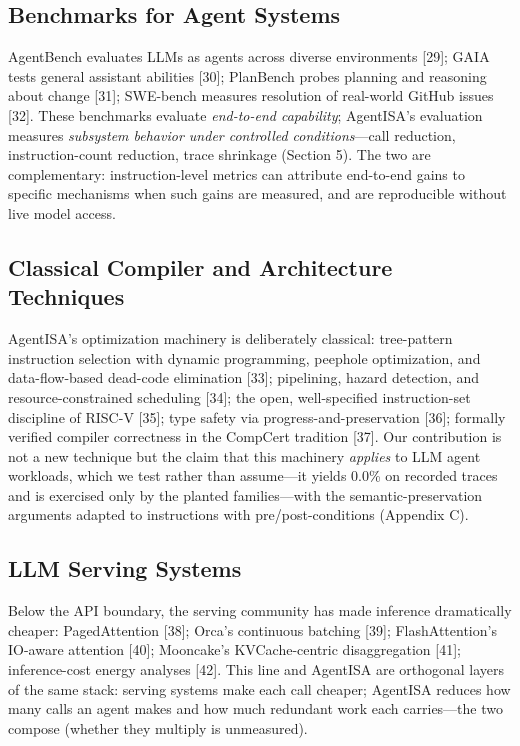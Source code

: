\documentclass[
  sigconf,
  anonymous]{acmart}
\begin{document}
\subsection{Benchmarks for Agent
Systems}\label{benchmarks-for-agent-systems}

AgentBench evaluates LLMs as agents across diverse environments
{[}29{]}; GAIA tests general assistant abilities {[}30{]}; PlanBench
probes planning and reasoning about change {[}31{]}; SWE-bench measures
resolution of real-world GitHub issues {[}32{]}. These benchmarks
evaluate \emph{end-to-end capability}; AgentISA's evaluation measures
\emph{subsystem behavior under controlled conditions}---call reduction,
instruction-count reduction, trace shrinkage (Section 5). The two are
complementary: instruction-level metrics can attribute end-to-end gains
to specific mechanisms when such gains are measured, and are
reproducible without live model access.

\subsection{Classical Compiler and Architecture
Techniques}\label{classical-compiler-and-architecture-techniques}

AgentISA's optimization machinery is deliberately classical:
tree-pattern instruction selection with dynamic programming, peephole
optimization, and data-flow-based dead-code elimination {[}33{]};
pipelining, hazard detection, and resource-constrained scheduling
{[}34{]}; the open, well-specified instruction-set discipline of RISC-V
{[}35{]}; type safety via progress-and-preservation {[}36{]}; formally
verified compiler correctness in the CompCert tradition {[}37{]}. Our
contribution is not a new technique but the claim that this machinery
\emph{applies} to LLM agent workloads, which we test rather than
assume---it yields 0.0\% on recorded traces and is exercised only by the
planted families---with the semantic-preservation arguments adapted to
instructions with pre/post-conditions (Appendix C).

\subsection{LLM Serving Systems}\label{llm-serving-systems}

Below the API boundary, the serving community has made inference
dramatically cheaper: PagedAttention {[}38{]}; Orca's continuous
batching {[}39{]}; FlashAttention's IO-aware attention {[}40{]};
Mooncake's KVCache-centric disaggregation {[}41{]}; inference-cost
energy analyses {[}42{]}. This line and AgentISA are orthogonal layers
of the same stack: serving systems make each call cheaper; AgentISA
reduces how many calls an agent makes and how much redundant work each
carries---the two compose (whether they multiply is unmeasured).
\end{document}
